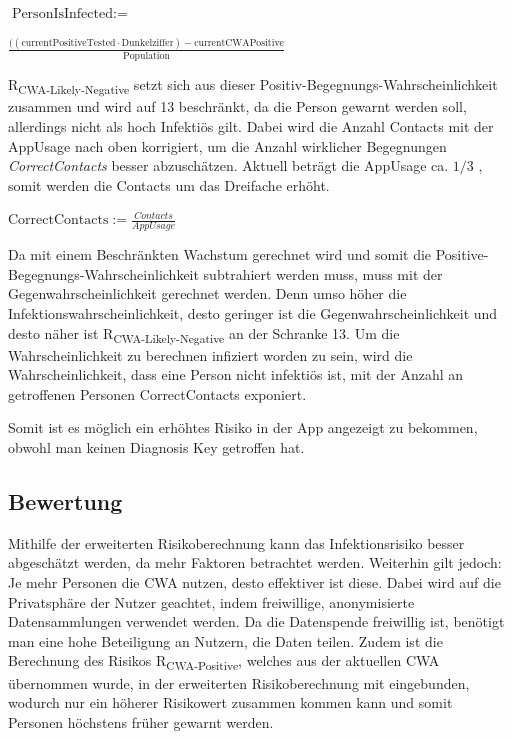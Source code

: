 \documentclass[conference,compsoc]{IEEEtran}
\begin{document}
\centerline{\text{ }}
\centerline{$\text{PersonIsInfected} :=$}
\centerline{$\frac{((\text{currentPositiveTested} \cdot \text{Dunkelziffer}) - \text{currentCWAPositive}}{\text{Population}}$}
\centerline{\text{ }}

R\textsubscript{CWA-Likely-Negative} setzt sich aus dieser Positiv-Begegnungs-Wahrscheinlichkeit zusammen und wird auf 13 beschränkt, 
da die Person gewarnt werden soll, allerdings nicht als hoch Infektiös gilt. 
Dabei wird die Anzahl Contacts mit der AppUsage nach oben korrigiert, um die Anzahl wirklicher Begegnungen \textit{CorrectContacts} besser abzuschätzen. 
Aktuell beträgt die AppUsage ca. $1/3$ \cite{Downloads}, somit werden die Contacts um das Dreifache erhöht. 

\centerline{\text{ }}
\centerline{$\text{CorrectContacts} := \frac{Contacts}{AppUsage}$}
\centerline{\text{ }}

Da mit einem Beschränkten Wachstum gerechnet wird und somit die Positive-Begegnungs-Wahrscheinlichkeit subtrahiert werden muss, 
muss mit der Gegenwahrscheinlichkeit gerechnet werden. Denn umso höher die Infektionswahrscheinlichkeit, 
desto geringer ist die Gegenwahrscheinlichkeit und desto näher ist R\textsubscript{CWA-Likely-Negative} an der Schranke 13. 
Um die Wahrscheinlichkeit zu berechnen infiziert worden zu sein, wird die Wahrscheinlichkeit, dass eine Person nicht infektiös ist, 
mit der Anzahl an getroffenen Personen CorrectContacts exponiert.

\centerline{\text{ }}
\centerline{}
\centerline{}
\centerline{\text{ }}

Somit ist es möglich ein erhöhtes Risiko in der App angezeigt zu bekommen, obwohl man keinen Diagnosis Key getroffen hat. 
\\
\subsection{Bewertung}
\label{Bewertung_Risikoberechnung}

Mithilfe der erweiterten Risikoberechnung kann das Infektionsrisiko besser abgeschätzt werden,
da mehr Faktoren betrachtet werden. Weiterhin gilt jedoch: Je mehr Personen die CWA nutzen, desto effektiver ist diese.
Dabei wird auf die Privatsphäre der Nutzer geachtet, indem freiwillige, anonymisierte Datensammlungen verwendet werden.
Da die Datenspende freiwillig ist, benötigt man eine hohe Beteiligung an Nutzern, die Daten teilen.
Zudem ist die Berechnung des Risikos R\textsubscript{CWA-Positive}, welches aus der aktuellen CWA übernommen wurde,
in der erweiterten Risikoberechnung mit eingebunden, wodurch nur ein höherer Risikowert zusammen kommen kann
und somit Personen höchstens früher gewarnt werden. 
\end{document}
